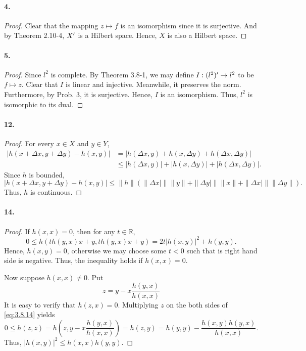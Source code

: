   \paragraph{4.}
  \begin{proof}
    Clear that the mapping $z\mapsto f$ is an isomorphism since it is
    surjective. And by Theorem 2.10-4, $X^\prime$ is a Hilbert space. Hence, $X$ is
    also a Hilbert space.
  \end{proof}
  
  \paragraph{5.}
  \begin{proof}
    Since $l^2$ is complete. By Theorem 3.8-1, we may define $I:(l^2)^\prime\to l^2$
    to be $f\mapsto z$. Clear that $I$ is linear and injective. Meanwhile, it 
    preserves the norm. Furthermore, by Prob. 3, it is surjective. Hence, $I$
    is an isomorphism. Thus, $l^2$ is isomorphic to its dual.
  \end{proof}
  
  \paragraph{12.}
  \begin{proof}
    For every $x\in X$ and $y\in Y$,
    \begin{align*}
      |h(x+\Delta x, y+\Delta y)-h(x, y)|
      &=|h(\Delta x, y)+h(x, \Delta y)+h(\Delta x, \Delta y)| \\
      &\le|h(\Delta x, y)|+|h(x, \Delta y)|+|h(\Delta x, \Delta y)|.
    \end{align*}
    Since $h$ is bounded, 
    \[
      |h(x+\Delta x, y+\Delta y)-h(x, y)|\le
      \|h\|(\|\Delta x|\|\|y\|+\|\Delta y|\|\|x\|+\|\Delta x|\|\|\Delta y\|).
    \]
    Thus, $h$ is continuous.
  \end{proof}
  
  \paragraph{14.}
  \begin{proof}
    If $h(x,x)=0$, then for any $t\in \mathbb{R}$,
    \[
      0\le h(th(y,x)x+y,th(y,x)x+y)=2t|h(x,y)|^2+h(y,y).
    \]
    Hence, $h(x,y)=0$, otherwise we may choose some $t<0$ such that is right
    hand side is negative. Thus, the inequality holds if $h(x,x)=0$.\par
    Now suppose $h(x,x)\ne 0$. Put 
    \begin{equation}
      \label{eq:3.8.14}
      z=y-x\frac{h(y, x)}{h(x, x)}
    \end{equation}
    It is easy to verify that $h(z,x)=0$. Multiplying $z$ on the both sides of 
    \eqref{eq:3.8.14} yields
    \[
      0\le h(z,z)=h\left(z,y-x\frac{h(y, x)}{h(x, x)}\right)=h(z,y)=
      h(y,y)-\frac{h(x,y)h(y,x)}{h(x,x)}.
    \]
    Thus, $|h(x,y)|^2\le h(x,x)h(y,y)$.
  \end{proof}

















